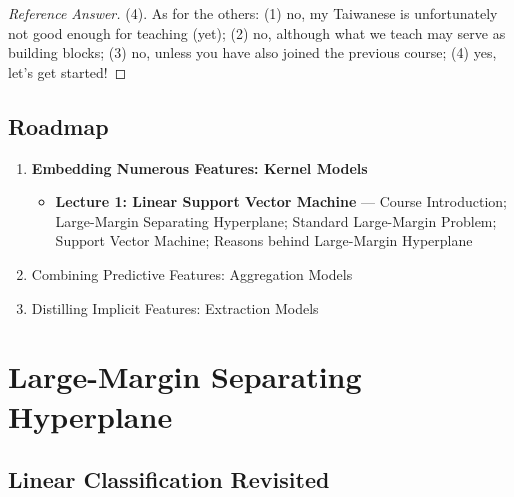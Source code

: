 \begin{proof}[Reference Answer]
    (4). As for the others: (1) no, my Taiwanese is unfortunately not good
    enough for teaching (yet); (2) no, although what we teach may serve as
    building blocks; (3) no, unless you have also joined the previous course;
    (4) yes, let's get started!
\end{proof}

\subsection{Roadmap}

\begin{enumerate}
    \item \textbf{Embedding Numerous Features: Kernel Models}
        \begin{itemize}
            \item[] \textbf{Lecture 1: Linear Support Vector Machine} ---
                Course Introduction; Large-Margin Separating Hyperplane;
                Standard Large-Margin Problem; Support Vector Machine; Reasons
                behind Large-Margin Hyperplane
        \end{itemize}
    \item Combining Predictive Features: Aggregation Models
    \item Distilling Implicit Features: Extraction Models
\end{enumerate}

\section{Large-Margin Separating Hyperplane}\label{sec:large-margin}


\subsection{Linear Classification Revisited}

